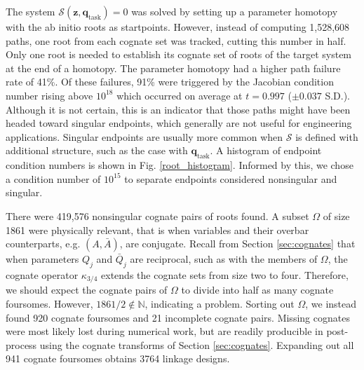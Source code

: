 \documentclass[journal]{IEEEtran}
\def\*#1{\bar{#1}} %
\begin{document}
The system $\mathcal{S}(\mathbf{z},\mathbf{q}_\text{task})=0$ was solved by setting up a parameter homotopy with the ab initio roots as startpoints.
However, instead of computing 1,528,608 paths, one root from each cognate set was tracked, cutting this number in half.
Only one root is needed to establish its cognate set of roots of the target system at the end of a homotopy.
The parameter homotopy had a higher path failure rate of 41\%.  Of these failures, 91\% were triggered by the Jacobian condition number rising above $10^{18}$ which occurred on average at $t=0.997$ ($\pm 0.037$ S.D.).
Although it is not certain, this is an indicator that those paths might have been headed toward singular endpoints, which generally are not useful for engineering applications.
Singular endpoints are usually more common when $\mathcal{S}$ is defined with additional structure, such as the case with $\mathbf{q}_\text{task}$.
A histogram of endpoint condition numbers is shown in Fig. \ref{root_histogram}.  Informed by this, we chose a condition number of $10^{15}$ to separate endpoints considered nonsingular and singular.




There were 419,576 nonsingular cognate pairs of roots found.
A subset $\Omega$ of size 1861 were physically relevant, that is when variables and their overbar counterparts, e.g. $(A,\*A)$, are conjugate.
Recall from Section \ref{sec:cognates} that when parameters $Q_j$ and $\*Q_j$ are reciprocal, such as with the members of $\Omega$, the cognate operator $\kappa_{3/4}$ extends the cognate sets from size two to four.
Therefore, we should expect the cognate pairs of $\Omega$ to divide into half as many cognate foursomes.
However, $1861/2\notin\mathbb{N}$, indicating a problem.
Sorting out $\Omega$, we instead found 920 cognate foursomes and 21 incomplete cognate pairs.
Missing cognates were most likely lost during numerical work, but are readily producible in post-process using the cognate transforms of Section \ref{sec:cognates}.
Expanding out all 941 cognate foursomes obtains 3764 linkage designs.
\end{document}
